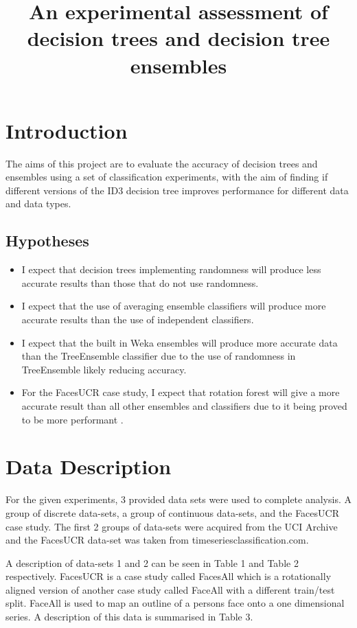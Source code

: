 \documentclass{cmppgr}
\title{An experimental assessment of decision trees and decision tree ensembles}
\begin{document}
\maketitle

\section {Introduction}
The aims of this project are to evaluate the accuracy of decision trees and ensembles 
using a set of classification experiments, with the aim of finding if different 
versions of the ID3 decision tree improves performance for different data and data 
types.

\subsection{Hypotheses}
\begin{itemize}
  \item I expect that decision trees implementing randomness will 
  produce less accurate results than those that do not use randomness.
  \item I expect that the use of averaging ensemble classifiers will 
  produce more accurate results than the use of independent classifiers.
  \item I expect that the built in Weka ensembles will produce more 
  accurate data than the TreeEnsemble classifier due to the use of 
  randomness in TreeEnsemble likely reducing accuracy.
  \item For the FacesUCR case study, I expect that rotation forest will 
  give a more accurate result than all other ensembles and classifiers 
  due to it being proved to be more performant \cite{bagnall2018rotation}.
\end{itemize}

\section{Data Description}
For the given experiments, 3 provided data sets were used to complete 
analysis. A group of discrete data-sets, a group of continuous data-sets, 
and the FacesUCR case study. The first 2 groups of data-sets were acquired 
from the UCI Archive and the FacesUCR data-set was taken from timeseriesclassification.com.

A description of data-sets 1 and 2 can be seen in Table 1 and Table 2 
respectively. FacesUCR is a case study called FacesAll which is a 
rotationally aligned version of another case study called FaceAll with 
a different train/test split. FaceAll is used to map an outline of a 
persons face onto a one dimensional series. A description of this 
data is summarised in Table 3.
\end{document}
